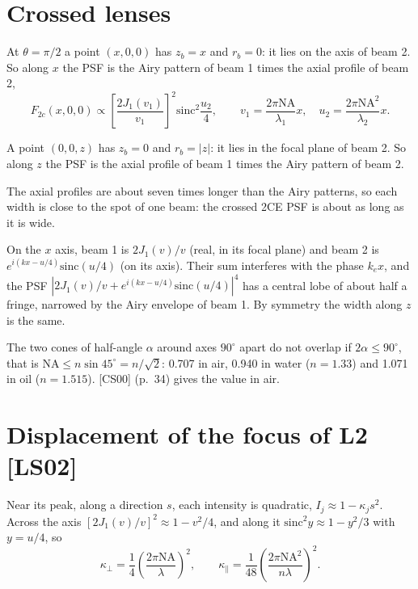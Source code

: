 \documentclass[11pt]{article}
\begin{document}
\section{Crossed lenses}
 At $\theta = \pi/2$ a point $(x, 0, 0)$ has $z_b = x$ and $r_b = 0$: it lies on the
axis of beam 2. So along $x$ the PSF is the Airy pattern of beam 1 times the axial profile of beam 2,
\begin{equation}F_{2c}(x, 0, 0) \propto \left[\frac{2J_1(v_1)}{v_1}\right]^2\mathrm{sinc}^2\frac{u_2}{4},\qquad
v_1 = \frac{2\pi\mathrm{NA}}{\lambda_1}x,\quad u_2 = \frac{2\pi\mathrm{NA}^2}{\lambda_2}x .\end{equation}

 A point $(0, 0, z)$ has $z_b = 0$ and $r_b = |z|$: it lies in the focal plane of
beam 2. So along $z$ the PSF is the axial profile of beam 1 times the Airy pattern of beam 2.

 The axial profiles are about seven times longer than the Airy patterns, so each width is close to the spot of
one beam: the crossed 2CE PSF is about as long as it is wide.

 On the $x$ axis, beam 1 is $2J_1(v)/v$ (real, in its focal plane) and beam 2 is
$e^{i(kx - u/4)}\mathrm{sinc}(u/4)$ (on its axis). Their sum interferes with the phase $k_ex$, and the PSF
$|2J_1(v)/v + e^{i(kx - u/4)}\mathrm{sinc}(u/4)|^4$ has a central lobe of about half a fringe, narrowed by the Airy
envelope of beam 1. By symmetry the width along $z$ is the same.


 The two cones of half-angle $\alpha$ around axes $90^\circ$ apart do not overlap if
$2\alpha \le 90^\circ$, that is $\mathrm{NA} \le n\sin45^\circ = n/\sqrt2$: 0.707 in air, 0.940 in water ($n = 1.33$)
and 1.071 in oil ($n = 1.515$). [CS00] (p.~34) gives the value in air.

\section{Displacement of the focus of L2 [LS02]}
 Near its peak, along a direction $s$, each intensity is quadratic, $I_j \approx 1 - \kappa_js^2$. Across the
axis $[2J_1(v)/v]^2 \approx 1 - v^2/4$, and along it $\mathrm{sinc}^2y \approx 1 - y^2/3$ with $y = u/4$, so
\begin{equation}\kappa_\perp = \frac14\left(\frac{2\pi\mathrm{NA}}{\lambda}\right)^2,\qquad
\kappa_\parallel = \frac{1}{48}\left(\frac{2\pi\mathrm{NA}^2}{n\lambda}\right)^2 .\end{equation}
\end{document}

